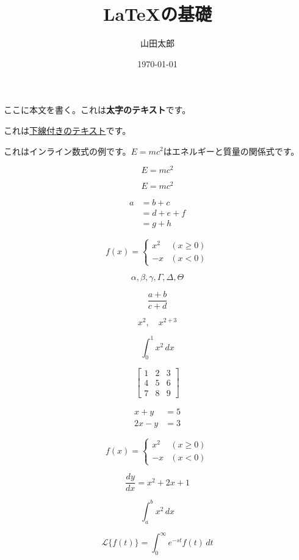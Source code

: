 \documentclass{article}
\title{LaTeXの基礎}
\author{山田太郎}
\date{\today}
\begin{document}
\maketitle

ここに本文を書く。これは\textbf{太字のテキスト}です。

これは\underline{下線付きのテキスト}です。

これはインライン数式の例です。$E=mc^2$はエネルギーと質量の関係式です。

\[
  E=mc^2
\]

\begin{equation}
  E=mc^2
\end{equation}

\begin{align}
  a & =b+c   \\
    & =d+e+f \\
    & =g+h
\end{align}

\begin{equation}
  f(x) =
  \begin{cases}
    x^2 & (x \geq 0) \\
    -x  & (x < 0)
  \end{cases}
\end{equation}

\[
  \alpha, \beta, \gamma, \Gamma, \Delta, \Theta
\]

\[
  \frac{a+b}{c+d}
\]

\[
  x^2,\quad x^{2+3}
\]

\[
  \int_{0}^{1}x^2\,dx
\]

\[
  \begin{bmatrix}
    1 & 2 & 3 \\
    4 & 5 & 6 \\
    7 & 8 & 9
  \end{bmatrix}
\]

\begin{align}
  x+y  & =5 \\
  2x-y & =3
\end{align}

\[
  f(x)=
  \begin{cases}
    x^2 & (x\geq 0) \\
    -x  & (x<0)
  \end{cases}
\]

\[
  \frac{dy}{dx}=x^2+2x+1
\]

\[
  \int_{a}^{b}x^2\,dx
\]

\[
  \mathcal{L}\{f(t)\}=\int_{0}^{\infty}e^{-st} f(t)\,dt
\]
\end{document}

